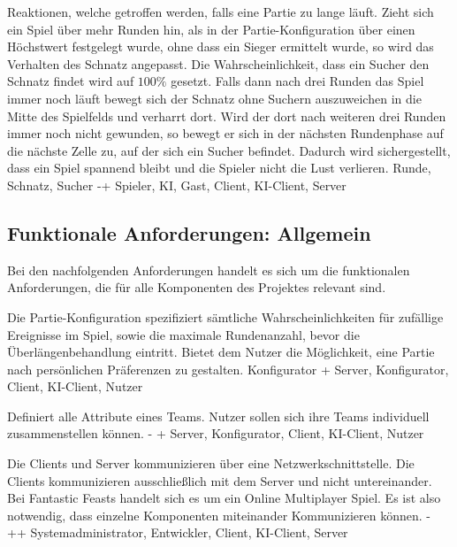         {Reaktionen, welche getroffen werden, falls eine Partie zu lange läuft. Zieht sich ein Spiel über mehr Runden hin, als in der Partie-Konfiguration über einen Höchstwert festgelegt wurde, ohne dass ein Sieger ermittelt wurde, so wird das Verhalten des Schnatz angepasst. Die Wahrscheinlichkeit, dass ein Sucher den Schnatz findet wird auf $100\%$ gesetzt. Falls dann nach drei Runden das Spiel immer noch läuft bewegt sich der Schnatz ohne Suchern auszuweichen in die Mitte des Spielfelds und verharrt dort. Wird der dort nach weiteren drei Runden immer noch nicht gewunden, so bewegt er sich in der nächsten Rundenphase auf die nächste Zelle zu, auf der sich ein Sucher befindet.}
        {Dadurch wird sichergestellt, dass ein Spiel spannend bleibt und die Spieler nicht die Lust verlieren.}
        {Runde, Schnatz, Sucher}
        {-+}
        {Spieler, KI, Gast, Client, KI-Client, Server}


\subsection{Funktionale Anforderungen: Allgemein}

Bei den nachfolgenden Anforderungen handelt es sich um die funktionalen Anforderungen, die für alle Komponenten des Projektes relevant sind.

        {Die Partie-Konfiguration spezifiziert sämtliche Wahrscheinlichkeiten für zufällige Ereignisse im Spiel, sowie die maximale Rundenanzahl, bevor die Überlängenbehandlung eintritt.}
        {Bietet dem Nutzer die Möglichkeit, eine Partie nach persönlichen Präferenzen zu gestalten.}
        {Konfigurator}
        {+}
        {Server, Konfigurator, Client, KI-Client, Nutzer}

        {Definiert alle Attribute eines Teams.}
        {Nutzer sollen sich ihre Teams individuell zusammenstellen können.}
        {-}
        {+}
        {Server, Konfigurator, Client, KI-Client, Nutzer}	
        
        {Die Clients und Server kommunizieren über eine Netzwerkschnittstelle. Die Clients kommunizieren ausschließlich mit dem Server und nicht untereinander.}
        {Bei \glqq{}Fantastic Feasts\grqq{} handelt sich es um ein Online Multiplayer Spiel. Es ist also notwendig, dass einzelne Komponenten miteinander Kommunizieren können.}
        {-}
        {++}
        {Systemadministrator, Entwickler, Client, KI-Client, Server}

